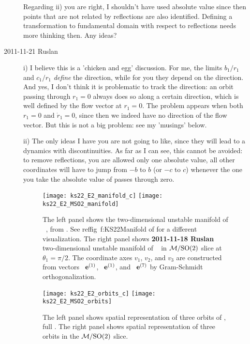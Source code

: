 \begin{description}
  Regarding ii) you are right, I shouldn't have used absolute value since then
  points that are not related by reflections are also identified. Defining
  a transformation to fundamental domain with respect to reflections
  needs more thinking then. Any ideas?

\item[2011-11-21 Ruslan] i) I believe this is a 'chicken and egg' discussion.  For me, the limits $b_1/r_1$ and $c_1/r_1$ {\em define} the direction, while for you they depend on the direction.  And yes, I don't think it is problematic to track the direction: an orbit passing through $r_1 = 0$ always does so along a certain direction, which is well defined by the flow vector at $r_1 = 0$.  The problem appears when both $r_1 = 0$ and $\dot{r}_1 = 0$, since then we indeed have no direction of the flow vector.  But this is not a big problem: see my 'musings' below.

    ii) The only ideas I have you are not going to like, since they will lead to a dynamics with discontinuities.  As far as I can see, this cannot be avoided: to remove reflections, you are allowed only one absolute value, all other coordinates will have to jump from $-b$ to $b$ (or $-c$ to $c$) whenever the one you take the absolute value of passes through zero.

\begin{figure}[ht]
\begin{center}
\texttt{[image: ks22\_E2\_manifold\_c]}
\texttt{[image: ks22\_E2\_MSO2\_manifold]}
\end{center}
\caption{
The left panel shows the two-dimensional unstable manifold of \eqv\
, from . See reffig~{f:KS22Manifold} of
\refref{SCD07} for a different visualization. The right panel shows {\bf
2011-11-18 Ruslan} two-dimensional unstable manifold of \eqv\ \EQV{2} in
$\pS/\SOn{2}$ slice at $\theta_1 = \pi/2$. The coordinate axes $v_1$,
$v_2$, and $v_3$ are constructed from vectors \Re\, $\jEigvec[1]$, \Im\,
$\jEigvec[1]$, and {\Re\,} $\jEigvec[7]$ by Gram-Schmidt
orthogonalization.
       }
\label{f:KS22E2man1}
\end{figure}

\begin{figure}[ht]
\begin{center}
\texttt{[image: ks22\_E2\_orbits\_c]}
\texttt{[image: ks22\_E2\_MSO2\_orbits]}
\end{center}
\caption{
The left panel shows spatial representation of three orbits of
, full \statesp. The right panel shows spatial
representation of three orbits in the $\pS/\SOn{2}$ slice.
       }
\label{f:ks22_E2_MSO2}
\end{figure}


\end{description}
